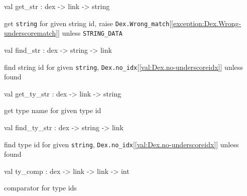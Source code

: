 \documentclass[11pt]{article}
\begin{document}
\label{val:Dex.get-underscorestr}\begin{ocamldoccode}
val get_str : dex -> link -> string
\end{ocamldoccode}
\begin{ocamldocdescription}
get {\tt{string}} for given string id,
 raise {\tt{Dex.Wrong\_match}}[\ref{exception:Dex.Wrong-underscorematch}] unless {\tt{STRING\_DATA}}


\end{ocamldocdescription}




\label{val:Dex.find-underscorestr}\begin{ocamldoccode}
val find_str : dex -> string -> link
\end{ocamldoccode}
\begin{ocamldocdescription}
find string id for given {\tt{string}},
 {\tt{Dex.no\_idx}}[\ref{val:Dex.no-underscoreidx}] unless found


\end{ocamldocdescription}




\label{val:Dex.get-underscorety-underscorestr}\begin{ocamldoccode}
val get_ty_str : dex -> link -> string
\end{ocamldoccode}
\begin{ocamldocdescription}
get type name for given type id


\end{ocamldocdescription}




\label{val:Dex.find-underscorety-underscorestr}\begin{ocamldoccode}
val find_ty_str : dex -> string -> link
\end{ocamldoccode}
\begin{ocamldocdescription}
find type id for given {\tt{string}},
 {\tt{Dex.no\_idx}}[\ref{val:Dex.no-underscoreidx}] unless found


\end{ocamldocdescription}




\label{val:Dex.ty-underscorecomp}\begin{ocamldoccode}
val ty_comp : dex -> link -> link -> int
\end{ocamldoccode}
\begin{ocamldocdescription}
comparator for type ids


\end{ocamldocdescription}
\end{document}

